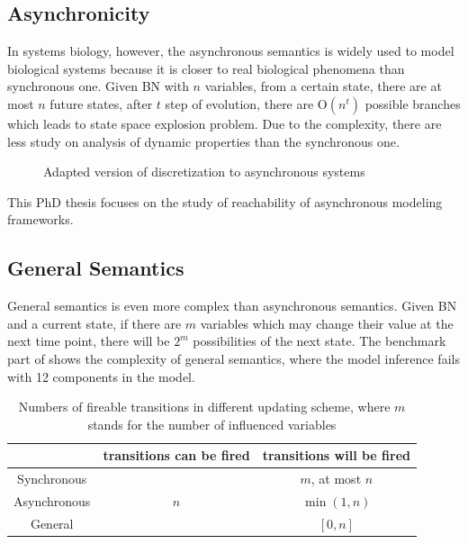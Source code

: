 \subsection{Asynchronicity}
In systems biology, however, the asynchronous semantics is widely used to model biological systems because it is closer to real biological phenomena than synchronous one.
Given BN with $n$ variables, from a certain state, there are at most $n$ future states, after $t$ step of evolution, there are O$(n^t)$ possible branches which leads to state space explosion problem.
Due to the complexity, there are less study on analysis of dynamic properties than the synchronous one.
\begin{figure}
    \centering
    
    \caption[Discretization]{Adapted version of discretization to asynchronous systems}
    \label{fig:my_label}
\end{figure}

This PhD thesis focuses on the study of reachability of asynchronous modeling frameworks.
\subsection{General Semantics}
General semantics is even more complex than asynchronous semantics.
Given BN and a current state, if there are $m$ variables which may change their value at the next time point, there will be $2^m$ possibilities of the next state.
The benchmark part of \cite{ribeiro2018learning} shows the complexity of general semantics, where the model inference fails with 12 components in the model. 
\begin{table}[ht]
    \centering
    \begin{tabular}{c|c|c}
            &transitions can be fired&transitions will be fired\\
            \hline
         Synchronous & \multirow{3}{*}{$n$} & $m$, at most $n$\\\cline{1-1} \cline{3-3}
            
         Asynchronous & & $\min(1,n)$\\ \cline{1-1} \cline{3-3}
            
         General &  & $[0,n]$
    \end{tabular}
    \caption[Update schemes]{Numbers of fireable transitions in different updating scheme, where $m$ stands for the number of influenced variables}
    \label{tab:semantics}
\end{table}

